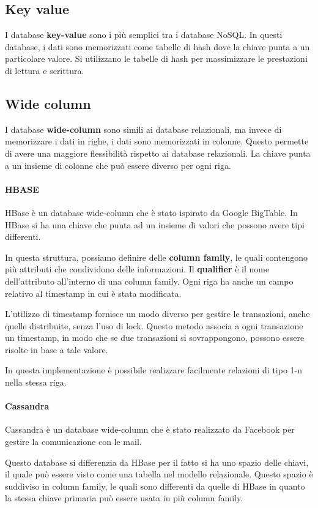 \subsection{Key value}
I database \textbf{key-value} sono i più semplici tra i database NoSQL. In questi
database, i dati sono memorizzati come tabelle di hash dove la chiave punta a un
particolare valore. Si utilizzano le tabelle di hash per massimizzare le prestazioni
di lettura e scrittura.
\subsection{Wide column}
I database \textbf{wide-column} sono simili ai database relazionali, ma invece di
memorizzare i dati in righe, i dati sono memorizzati in colonne. Questo permette
di avere una maggiore flessibilità rispetto ai database relazionali. La chiave
punta a un insieme di colonne che può essere diverso per ogni riga.
\paragraph{HBASE}
HBase è un database wide-column che è stato ispirato da Google BigTable. In HBase
si ha una chiave che punta ad un insieme di valori che possono avere tipi differenti.

In questa struttura, possiamo definire delle \textbf{column family}, le quali
contengono più attributi che condividono delle informazioni. Il \textbf{qualifier} è
il nome dell'attributo all'interno di una column family. Ogni riga ha anche
un campo relativo al timestamp in cui è stata modificata.

L'utilizzo di timestamp fornisce un modo diverso per gestire le transazioni,
anche quelle distribuite, senza l'uso di lock. Questo metodo associa a ogni
transazione un timestamp, in modo che se due transazioni si sovrappongono,
possono essere risolte in base a tale valore.

In questa implementazione è possibile realizzare facilmente relazioni di tipo 1-n
nella stessa riga.
\paragraph{Cassandra}
Cassandra è un database wide-column che è stato realizzato da Facebook per gestire
la comunicazione con le mail.

Questo database si differenzia da HBase per il fatto si ha uno spazio delle chiavi,
il quale può essere visto come una tabella nel modello relazionale. Questo spazio
è suddiviso in column family, le quali sono differenti da quelle di HBase in quanto
la stessa chiave primaria può essere usata in più column family.

